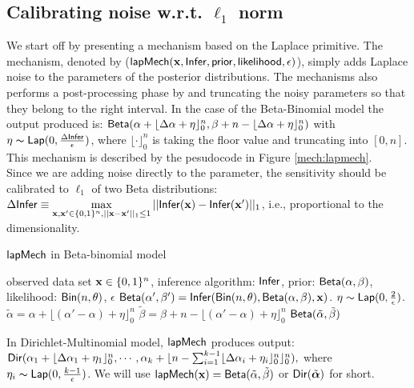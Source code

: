 \documentclass{article}
\begin{document}
\subsection{Calibrating noise w.r.t. $\ell_1$ norm}
We start off by presenting a mechanism based on the Laplace primitive.
The mechanism, denoted by {\color{red}{i think this macro has too many arguments}}($\mathsf{lapMech}(\textbf{x},\mathsf{Infer}, \mathsf{prior}, \mathsf{likelihood}, \epsilon)$),
simply adds Laplace noise to the parameters of the posterior distributions. The mechanisms also performs a
post-processing phase by {\color{red}{flooring}} and  truncating the noisy parameters so that they belong to the right interval.
In the case of the Beta-Binomial model the output produced is: $\mathsf{Beta}(\alpha +  \lfloor{\Delta \alpha + \eta}\rfloor^n_0,\beta + n - \lfloor{\Delta \alpha + \eta}\rfloor^n_0)$
with $\eta \thicksim \mathsf{Lap}(0, \frac{\Delta \mathsf{Infer}}{\epsilon})$, where $\lfloor \cdot \rfloor^n_0$ is taking the floor value and truncating into
$[0,n]$. This mechanism is described by the pesudocode in Figure \ref{mech:lapmech}.\\
Since we are adding noise directly to the parameter, the sensitivity should be calibrated to $\ell_1$ of two Beta distributions:
$
   \Delta \mathsf{Infer} \equiv \max\limits_{\textbf{x}, \textbf{x}' \in \{0,1\}^{n}, ||\textbf{x} - \textbf{x}'||_1 \leq 1} ||\mathsf{Infer}(\textbf{x}) - \mathsf{Infer}(\textbf{x}')||_1
$,
i.e., proportional to the dimensionality.
  \begin{algorithm}
  \caption{$\mathsf{lapMech}$ in Beta-binomial model}
  \label{mech:lapmech}
  \begin{algorithmic}
  \REQUIRE observed data set $\textbf{x} \in \{0,1\}^n$, inference algorithm: $\mathsf{Infer}$, 
  prior: $\mathsf{Beta}(\alpha, \beta)$, likelihood: $\mathsf{Bin}(n, \theta)$, $\epsilon$
  \STATE {} $\mathsf{Beta}(\alpha', \beta') = \mathsf{Infer}(\mathsf{Bin}(n, \theta), \mathsf{Beta}(\alpha, \beta), \textbf{x})$.  
  \STATE {} $\eta \sim \mathsf{Lap}(0, \frac{2}{\epsilon})$.
  \STATE {} $\tilde{\alpha}=\alpha + \lfloor{(\alpha' - \alpha) + \eta}\rfloor^n_0$ 
  \STATE {} $\tilde{\beta}=\beta + n - \lfloor{(\alpha' - \alpha) + \eta}\rfloor^n_0$ 
  \ENSURE $\mathsf{Beta}(\tilde{\alpha}, \tilde{\beta})$
  \end{algorithmic}
  \end{algorithm}

  In Dirichlet-Multinomial model, $\mathsf{lapMech}$ produces output:
  $\mathsf{Dir}(\alpha_1 +  \lfloor{\Delta \alpha_1 + \eta_1}\rfloor^n_0, \cdots, \alpha_k + \lfloor n - \sum_{i = 1}^{k-1}\lfloor{\Delta \alpha_i + \eta_i}\rfloor^n_0 \rfloor^n_0),$
  where $\eta_i \thicksim \mathsf{Lap}(0, \frac{k - 1}{\epsilon})$.
  We will use $ \mathsf{lapMech}(\textbf{x}) = \mathsf{Beta}(\tilde{\alpha}, \tilde{\beta})$ or $\mathsf{Dir}(\tilde{\boldsymbol{\alpha}})$ for short.
\end{document}
